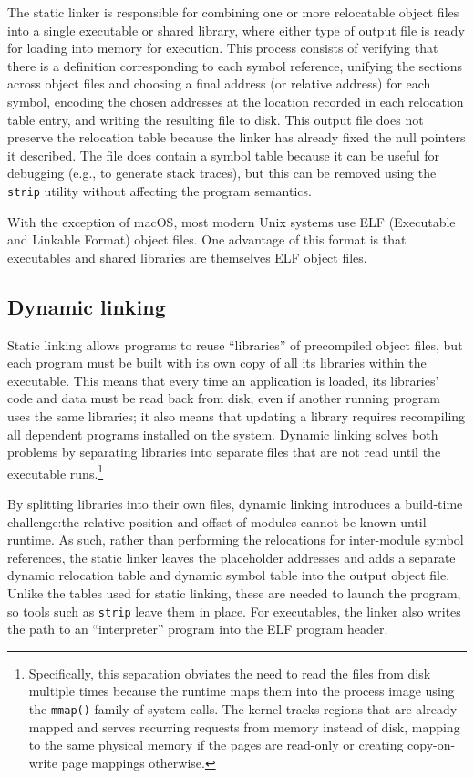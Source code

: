 The static linker is responsible for combining one or more relocatable object files
into a single executable or shared library, where either type of output file is
ready for loading into memory for execution.  This process consists of verifying that
there is a definition corresponding to each symbol reference, unifying the sections
across object files and choosing a final address (or relative address) for each
symbol, encoding the chosen addresses at the location recorded in each relocation
table entry, and writing the resulting file to disk.  This output file does not
preserve the relocation table because the linker has already fixed the null pointers
it described.  The file does contain a symbol table because it can be useful for
debugging (e.g., to generate stack traces), but this can be removed using the
\texttt{strip} utility without affecting the program semantics.

With the exception of macOS, most modern Unix systems use ELF (Executable and
Linkable Format) object files.  One advantage of this format is that executables and
shared libraries are themselves ELF object files.


\subsection{Dynamic linking}
\label{sec:libgotcha:dylink}
\label{sec:relinking}

Static linking allows programs to reuse ``libraries'' of precompiled object files,
but each program must be built with its own copy of all its libraries within the
executable.  This means that every time an application is loaded, its libraries' code
and data must be read back from disk, even if another running program uses the same
libraries; it also means that updating a library requires recompiling all dependent
programs installed on the system.  Dynamic linking solves both problems by separating
libraries into separate files that are not read until the executable runs.\footnote{
Specifically, this separation obviates the need to read the files from disk multiple
times because the runtime maps them into the process image using the \texttt{mmap()}
family of system calls.  The kernel tracks regions that are already mapped and serves
recurring requests from memory instead of disk, mapping to the same physical memory
if the pages are read-only or creating copy-on-write page mappings otherwise.}

By splitting libraries into their own files, dynamic linking introduces a build-time
challenge:\@ the relative position and offset of modules cannot be known until
runtime.  As such, rather than performing the relocations for inter-module symbol
references, the static linker leaves the placeholder addresses and adds a separate
dynamic relocation table and dynamic symbol table into the output object file.
Unlike the tables used for static linking, these are needed to launch the program, so
tools such as \texttt{strip} leave them in place.  For executables, the linker also
writes the path to an ``interpreter'' program into the ELF program header.

